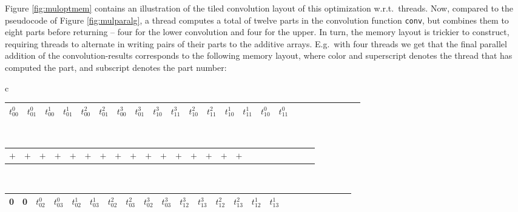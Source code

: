 Figure \ref{fig:muloptmem} contains an illustration of the tiled convolution
layout of this optimization w.r.t.\ threads. Now, compared to the pseudocode of
Figure \ref{fig:mulparalg}, a thread computes a total of twelve parts in the
convolution function \texttt{conv}, but combines them to eight parts before
returning -- four for the lower convolution and four for the upper. In turn, the
memory layout is trickier to construct, requiring threads to alternate in
writing pairs of their parts to the additive arrays. E.g.\ with four threads we
get that the final parallel addition of the convolution-results corresponds to
the following memory layout, where color and superscript denotes the thread that
has computed the part, and subscript denotes the part number:

\begin{center}
  \small
  \begin{tabular}{c}
    \begin{tabular}{|C{0.4cm}|C{0.4cm}|C{0.4cm}|C{0.4cm}|C{0.4cm}|C{0.4cm}|C{0.4cm}|C{0.4cm}|C{0.4cm}|C{0.4cm}|C{0.4cm}|C{0.4cm}|C{0.4cm}|C{0.4cm}|C{0.4cm}|C{0.4cm}|C{0.4cm}|C{0.4cm}|C{0.4cm}|C{0.4cm}|C{0.4cm}|C{0.4cm}|C{0.4cm}|C{0.4cm}|}
      \hline
      \color{Crimson}$t^0_{00}$ & \color{Crimson}$t^0_{01}$ & \color{RoyalBlue}$t^1_{00}$ & \color{RoyalBlue}$t^1_{01}$  & \color{ForestGreen}$t^2_{00}$ & \color{ForestGreen}$t^2_{01}$  & \color{Chocolate}$t^3_{00}$ & \color{Chocolate}$t^3_{01}$  & \color{Chocolate}$t^3_{10}$ & \color{Chocolate}$t^3_{11}$  & \color{ForestGreen}$t^2_{10}$ & \color{ForestGreen}$t^2_{11}$  & \color{RoyalBlue}$t^1_{10}$ & \color{RoyalBlue}$t^1_{11}$ & \color{Crimson}$t^0_{10}$ & \color{Crimson}$t^0_{11}$ \\
      \hline
    \end{tabular}\\
    \begin{tabular}{C{0.41cm}C{0.41cm}C{0.41cm}C{0.41cm}C{0.41cm}C{0.41cm}C{0.41cm}C{0.41cm}C{0.41cm}C{0.41cm}C{0.41cm}C{0.41cm}C{0.41cm}C{0.41cm}C{0.41cm}C{0.41cm}C{0.41cm}C{0.41cm}C{0.41cm}C{0.41cm}C{0.41cm}C{0.41cm}C{0.41cm}C{0.41cm}}
      $+$ & $+$ & $+$ & $+$  & $+$ & $+$ & $+$ & $+$  & $+$ & $+$ & $+$ & $+$  & $+$ & $+$ & $+$ & $+$
    \end{tabular}\\
    \begin{tabular}{|C{0.4cm}|C{0.4cm}|C{0.4cm}|C{0.4cm}|C{0.4cm}|C{0.4cm}|C{0.4cm}|C{0.4cm}|C{0.4cm}|C{0.4cm}|C{0.4cm}|C{0.4cm}|C{0.4cm}|C{0.4cm}|C{0.4cm}|C{0.4cm}|C{0.4cm}|C{0.4cm}|C{0.4cm}|C{0.4cm}|C{0.4cm}|C{0.4cm}|C{0.4cm}|C{0.4cm}|}
       & 0 & \color{Crimson}$t^0_{02}$ & \color{Crimson}$t^0_{03}$  & \color{RoyalBlue}$t^1_{02}$ & \color{RoyalBlue}$t^1_{03}$ & \color{ForestGreen}$t^2_{02}$ & \color{ForestGreen}$t^2_{03}$ & \color{Chocolate}$t^3_{02}$ & \color{Chocolate}$t^3_{03}$ & \color{Chocolate}$t^3_{12}$ & \color{Chocolate}$t^3_{13}$ & \color{ForestGreen}$t^2_{12}$ & \color{ForestGreen}$t^2_{13}$ & \color{RoyalBlue}$t^1_{12}$ & \color{RoyalBlue}$t^1_{13}$ \\
      \hline
    \end{tabular}
  \end{tabular}
\end{center}~


